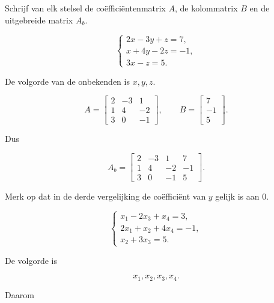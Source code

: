 \documentclass{ximera}
\begin{document}
\begin{oefening}{\oefB\ESS}

Schrijf van elk stelsel de coëfficiëntenmatrix \(A\),
de kolommatrix \(B\) en de uitgebreide matrix \(A_b\).

\begin{question}

\[
\begin{cases}
2x-3y+z=7,\\
x+4y-2z=-1,\\
3x-z=5.
\end{cases}
\]

\begin{oplossing}

De volgorde van de onbekenden is \(x,y,z\).

\[
A=
\begin{bmatrix}
2&-3&1\\
1&4&-2\\
3&0&-1
\end{bmatrix},
\qquad
B=
\begin{bmatrix}
7\\-1\\5
\end{bmatrix}.
\]

Dus

\[
A_b=
\left[
\begin{array}{ccc|c}
2&-3&1&7\\
1&4&-2&-1\\
3&0&-1&5
\end{array}
\right].
\]

Merk op dat in de derde vergelijking de coëfficiënt van \(y\)
gelijk is aan \(0\).

\end{oplossing}

\end{question}


\begin{question}

\[
\begin{cases}
x_1-2x_3+x_4=3,\\
2x_1+x_2+4x_4=-1,\\
x_2+3x_3=5.
\end{cases}
\]

\begin{oplossing}

De volgorde is

\[
x_1,x_2,x_3,x_4.
\]

Daarom


\end{oplossing}
\end{question}
\end{oefening}
\end{document}
